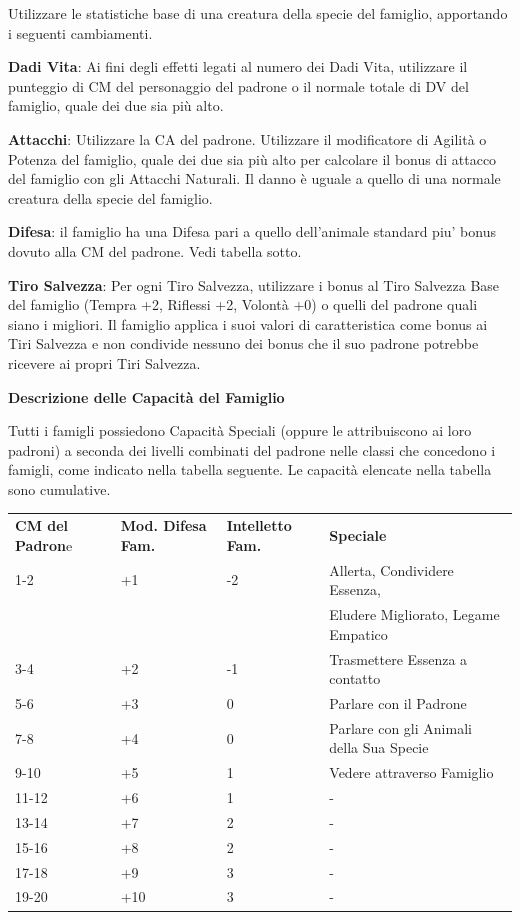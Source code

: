 \documentclass[a4paper,11pt,twoside,openany]{book}
\begin{document}
\bigskip

Utilizzare le statistiche base di una creatura della specie del famiglio, apportando i seguenti cambiamenti.

\bigskip

\textbf{Dadi Vita}: Ai fini degli effetti legati al numero dei Dadi Vita, utilizzare il punteggio di CM del personaggio del padrone o il normale totale di DV del famiglio, quale dei due sia più alto.

\textbf{Attacchi}: Utilizzare la CA del padrone. Utilizzare il modificatore di Agilità o Potenza del famiglio, quale dei due sia più alto per calcolare il bonus di attacco del famiglio con gli Attacchi Naturali. Il danno è uguale a quello di una normale creatura della specie del famiglio.

\textbf{Difesa}: il famiglio ha una Difesa pari a quello dell'animale standard piu' bonus dovuto alla CM del padrone. Vedi tabella sotto.

\textbf{Tiro Salvezza}: Per ogni Tiro Salvezza, utilizzare i bonus al Tiro Salvezza Base del famiglio (Tempra +2, Riflessi +2, Volontà +0) o quelli del padrone quali siano i migliori. Il famiglio applica i suoi valori di caratteristica come bonus ai Tiri Salvezza e non condivide nessuno dei bonus che il suo padrone potrebbe ricevere ai propri Tiri Salvezza.

\bigskip

\textbf{Descrizione delle Capacità del Famiglio}

Tutti i famigli possiedono Capacità Speciali (oppure le attribuiscono ai loro padroni) a seconda dei livelli combinati del padrone nelle classi che concedono i famigli, come indicato nella tabella seguente. Le capacità elencate nella tabella sono cumulative.

\bigskip

\begin{tabularx}{0.95\textwidth}{lllX}
	\toprule
	\textbf{CM del Padron}e & \textbf{Mod. Difesa Fam.} & \textbf{Intelletto Fam.} & \textbf{Speciale}\\
	1-2      & +1       & -2    & Allerta, Condividere Essenza, \\
	         &  		&  		& Eludere Migliorato, Legame Empatico\\
	3-4      & +2       & -1    & Trasmettere Essenza a contatto\\
	5-6      & +3       & 0     & Parlare con il Padrone\\
	7-8      & +4       & 0     & Parlare con gli Animali della Sua Specie\\
	9-10     & +5       & 1     & Vedere attraverso Famiglio\\
	11-12    & +6       & 1     & -\\
	13-14    & +7       & 2     & -\\
	15-16    & +8       & 2     & -\\
	17-18    & +9       & 3     & -\\
	19-20    & +10      & 3     & -\\
\end{tabularx}
\end{document}
